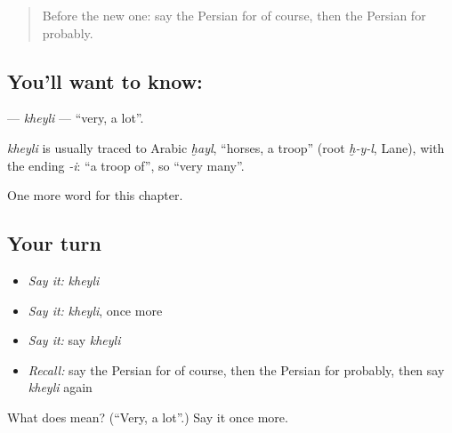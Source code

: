 \begin{quote}
Before the new one: say the Persian for of course, then the Persian for probably.
\end{quote}

\subsection*{You'll want to know: }
\textbf{} — \emph{kheyli} — \textquotedblleft{}very, a lot\textquotedblright{}.

\begin{cousinweb}
\emph{kheyli} is usually traced to Arabic \emph{ḫayl}, \textquotedblleft{}horses, a troop\textquotedblright{} (root \emph{ḫ-y-l}, Lane), with the ending \emph{-i}: \textquotedblleft{}a troop of\textquotedblright{}, so \textquotedblleft{}very many\textquotedblright{}.
\end{cousinweb}

\begin{grammarlens}[title={What you've built}]
One more word for this chapter.
\end{grammarlens}

\subsection*{Your turn}
\begin{itemize}
\raggedright
  \item \emph{Say it:} \emph{kheyli}
  \item \emph{Say it:} \emph{kheyli}, once more
  \item \emph{Say it:} say \emph{kheyli}
  \item \emph{Recall:} say the Persian for of course, then the Persian for probably, then say \emph{kheyli} again
\end{itemize}

\begin{tcolorbox}[breakable,colback=teal!4,colframe=teal!35!black,title={Before you move on}]
What does  mean? (\textquotedblleft{}Very, a lot\textquotedblright{}.) Say it once more.
\end{tcolorbox}
